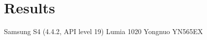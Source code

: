 \documentclass[thesis.tex]{subfiles}
\begin{document}
\chapter{Results}
\label{chapter:results}

Samsung S4 (4.4.2, API level 19)
Lumia 1020
Yongnuo YN565EX
\end{document}

